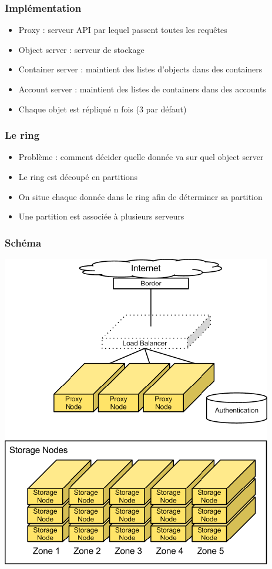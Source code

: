  \begin{frame}
    \frametitle{Implémentation}
    \begin{itemize}
      \item Proxy : serveur API par lequel passent toutes les requêtes
      \item Object server : serveur de stockage
      \item Container server : maintient des listes d'objects dans des containers
      \item Account server : maintient des listes de containers dans des accounts
      \item Chaque objet est répliqué n fois (3 par défaut)
    \end{itemize}
  \end{frame}

  \begin{frame}
    \frametitle{Le ring}
    \begin{itemize}
      \item Problème : comment décider quelle donnée va sur quel object server
      \item Le ring est découpé en partitions
      \item On situe chaque donnée dans le ring afin de déterminer sa partition
      \item Une partition est associée à plusieurs serveurs
    \end{itemize}
  \end{frame}

  \begin{frame}
    \frametitle{Schéma}
    \includegraphics[width=\textwidth,height=\textheight]{images/swift-schema.png}
  \end{frame}

